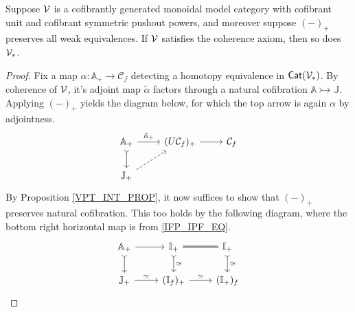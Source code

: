 \documentclass[a4paper,10pt
,draft
]{article}%
\newcommand{\I}{\mathbb I}
\newcommand{\J}{\mathbb J}
\renewcommand{\1}{\eta}%
\begin{document}
{  \begin{proposition}
        \label{PT_COH_PROP}
        Suppose $\mathcal V$ is a cofibrantly generated monoidal model category with cofibrant unit and cofibrant symmetric pushout powers,
        and moreover suppose $(-)_+$ preserves all weak equivalences.
        If $\mathcal V$ satisfies the coherence axiom, then so does $\V_{\**}$.
  \end{proposition}
  \begin{proof}
        Fix a map $\alpha:\mathbb A_+ \to \mathcal C_f$ detecting a homotopy equivalence in $\Cat(\V_{\**})$.
        By coherence of $\mathcal V$, it's adjoint map $\tilde \alpha$
        factors through a natural cofibration $\mathbb A \rightarrowtail \J$.
        Applying $(-)_+$ yields the diagram below, for which the top arrow is again $\alpha$ by adjointness.
        \begin{equation}
              \begin{tikzcd}
                    \mathbb A_+ \arrow[d, rightarrowtail] \arrow[r, "\tilde{\alpha}_+"]
                    &
                    (U \mathcal C_f)_+ \arrow[r]
                    &
                    \mathcal C_f
                    \\
                    \J_+ \arrow[ur, dashed]
              \end{tikzcd}
        \end{equation}
        By Proposition \ref{VPT_INT_PROP}, it now suffices to show that $(-)_+$ preserves natural cofibration.
        This too holds by the following diagram, where the bottom right horizontal map is from \eqref{IFP_IPF_EQ}.
        \begin{equation}
              \begin{tikzcd}
                    \mathbb A_+ \arrow[d, rightarrowtail] \arrow[r]
                    &
                    \I_+ \arrow[d, rightarrowtail, "\simeq"] \arrow[r, equal]
                    &
                    \I_+ \arrow[d, rightarrowtail, "\simeq"]
                    \\
                    \J_+ \arrow[r, "\simeq"]
                    &
                    (\I_f)_+ \arrow[r, "\simeq"]
                    &
                    (\I_+)_f
              \end{tikzcd}
        \end{equation}
  \end{proof}

}
\end{document}
